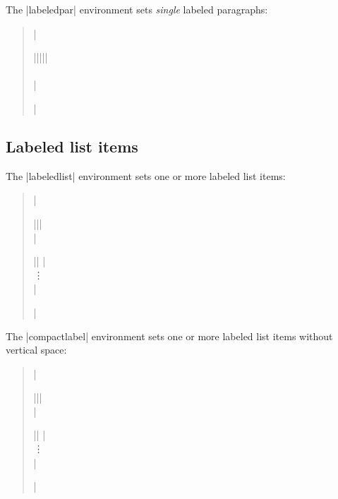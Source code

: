 \documentclass[a4paper]{ltxdoc}
\begin{document}
 The |labeledpar| environment sets \emph{single}
labeled paragraphs:
\begin{quote}
|\begin{labeledpar}{||}{||}| \\
 \\
|\end{labeledpar}|
\end{quote}

\subsection{Labeled list items}

 The |labeledlist| environment sets one or more
labeled list items:
\begin{quote}
|\begin{labeledlist}{||}| \\
|\item[|\meta{label}|]| \\
\vdots \\
|\end{labeledlist}|
\end{quote}

 The |compactlabel| environment sets one or more
labeled list items without vertical space:
\begin{quote}
|\begin{compactlabel}{||}| \\
|\item[|\meta{label}|]| \\
\vdots \\
|\end{compactlabel}|
\end{quote}
\end{document}
